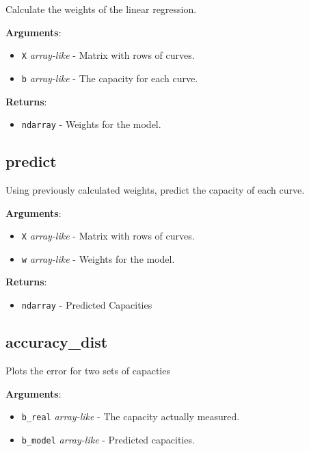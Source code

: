 Calculate the weights of the linear regression.

\textbf{Arguments}:

\begin{itemize}
\tightlist
\item
  \texttt{X} \emph{array-like} - Matrix with rows of curves.
\item
  \texttt{b} \emph{array-like} - The capacity for each curve.
\end{itemize}

\textbf{Returns}:

\begin{itemize}
\tightlist
\item
  \texttt{ndarray} - Weights for the model.
\end{itemize}

\subsection{predict}

\begin{Shaded}
\begin{Highlighting}[]
\end{Highlighting}
\end{Shaded}

Using previously calculated weights, predict the capacity of each curve.

\textbf{Arguments}:

\begin{itemize}
\tightlist
\item
  \texttt{X} \emph{array-like} - Matrix with rows of curves.
\item
  \texttt{w} \emph{array-like} - Weights for the model.
\end{itemize}

\textbf{Returns}:

\begin{itemize}
\tightlist
\item
  \texttt{ndarray} - Predicted Capacities
\end{itemize}

\subsection{accuracy\_dist}

\begin{Shaded}
\begin{Highlighting}[]
\end{Highlighting}
\end{Shaded}

Plots the error for two sets of capacties

\textbf{Arguments}:

\begin{itemize}
\tightlist
\item
  \texttt{b\_real} \emph{array-like} - The capacity actually measured.
\item
  \texttt{b\_model} \emph{array-like} - Predicted capacities.
\end{itemize}

